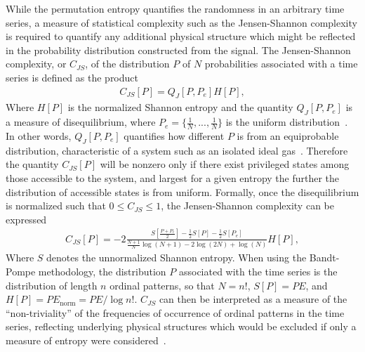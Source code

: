 \documentclass[aps,prx,twocolumn,secnumarabic,nobalancelastpage,amsmath,amssymb,
nofootinbib]{revtex4-1}
\begin{document}
While the permutation entropy quantifies the randomness in an arbitrary time series, a measure of statistical complexity such as the Jensen-Shannon complexity is required to quantify any additional physical structure which might be reflected in the probability distribution constructed from the signal. The Jensen-Shannon complexity, or $C_{JS}$, of the distribution $P$ of $N$ probabilities associated with a time series is defined as the product
\begin{align}
C_{JS}[P]=Q_J[P,P_e]H[P],
\end{align}
Where $H[P]$ is the normalized Shannon entropy and the quantity $ Q_J[P,P_e]$ is a measure of disequilibrium, where $P_e =\{\frac{1}{N}, ..., \frac{1}{N} \}$ is the uniform distribution~\cite{lamberti2004}. In other words, $ Q_J[P,P_e]$ quantifies how different $P$ is from an equiprobable distribution, characteristic of a system such as an isolated ideal gas~\cite{lopez1995}. Therefore the quantity $C_{JS}[P]$ will be nonzero only if there exist privileged states among those accessible to the system, and largest for a given entropy the further the distribution of accessible states is from uniform. Formally, once the disequilibrium is normalized such that $0 \leq C_{JS} \leq 1$, the Jensen-Shannon complexity can be expressed 
\begin{align}
C_{JS}[P]= -2\frac{S \left[ \frac{P+P_e}{2} \right] - \frac{1}{2}S[P]-\frac{1}{2}S[P_e] }{\frac{N+1}{N} \log(N+1)-2 \log(2N)+\log(N)} H[P],
\end{align}
Where $S$ denotes the unnormalized Shannon entropy. When using the Bandt-Pompe methodology, the distribution $P$ associated with the time series is the distribution of length $n$ ordinal patterns, so that $N=n!$, $S[P]=PE$, and $H[P] =PE_\text{norm}=PE/ \log n!$. $C_{JS}$ can then be interpreted as a measure of the ``non-triviality'' of the frequencies of occurrence of ordinal patterns in the time series, reflecting underlying physical structures which would be excluded if only a measure of entropy were considered~\cite{lamberti2004}.
\end{document}
